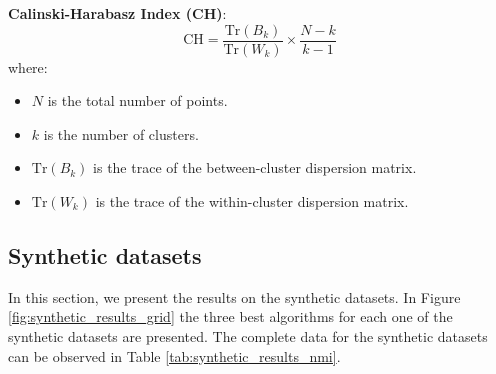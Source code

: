 \documentclass[
	10pt,
	parskip=half-,	
	paper=a4,
	english
	]{scrartcl}
\begin{document}
\vspace{0.5cm}
\textbf{Calinski-Harabasz Index (CH)}:
\begin{equation}
    \text{CH} = \frac{\text{Tr}(B_k)}{\text{Tr}(W_k)} \times \frac{N - k}{k-1}
    \label{eq13}
\end{equation}
where:
\begin{itemize}
    \item $N$ is the total number of points.
    \item $k$ is the number of clusters.
    \item $\text{Tr}(B_k)$ is the trace of the between-cluster dispersion matrix.
    \item $\text{Tr}(W_k)$ is the trace of the within-cluster dispersion matrix.
\end{itemize}

\subsection{Synthetic datasets}

In this section, we present the results on the synthetic datasets. In Figure \ref{fig:synthetic_results_grid} the three best algorithms for each one of the synthetic datasets are presented. The complete data for the synthetic datasets can be observed in Table \ref{tab:synthetic_results_nmi}. 
\end{document}
